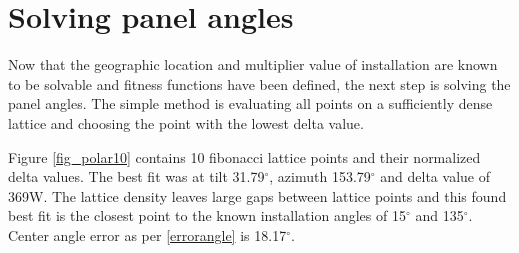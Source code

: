 

\newpage
\section{Solving panel angles}
Now that the geographic location and multiplier value of installation are known to be solvable and fitness functions have been defined, the next step is solving the panel angles. The simple method is evaluating all points on a sufficiently dense lattice and choosing the point with the lowest delta value.

Figure \ref{fig_polar10} contains 10 fibonacci lattice points and their normalized delta values. The best fit was at tilt 31.79$^\circ$, azimuth 153.79$^\circ$ and delta value of 369W. The lattice density leaves large gaps between lattice points and this found best fit is the closest point to the known installation angles of 15$^\circ$ and 135$^\circ$. Center angle error as per \ref{errorangle} is 18.17$^\circ$.






